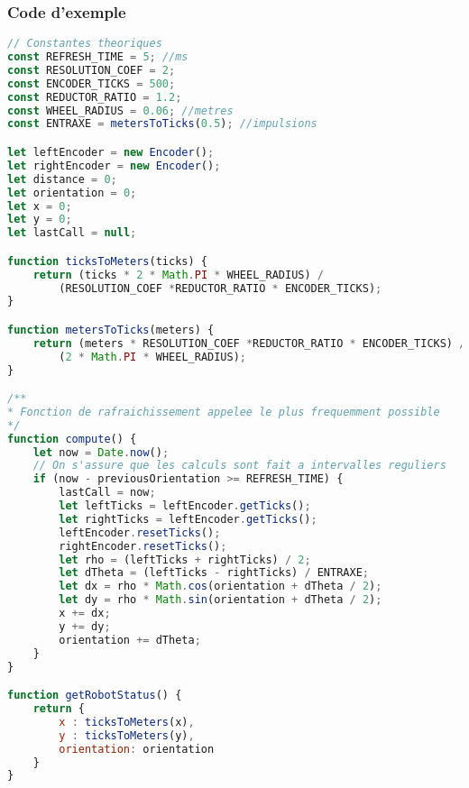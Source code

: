         \subsubsection{Code d'exemple}
            \begin{lstlisting}[language=JavaScript]
// Constantes theoriques
const REFRESH_TIME = 5; //ms
const RESOLUTION_COEF = 2;
const ENCODER_TICKS = 500;
const REDUCTOR_RATIO = 1.2;
const WHEEL_RADIUS = 0.06; //metres
const ENTRAXE = metersToTicks(0.5); //impulsions

let leftEncoder = new Encoder();
let rightEncoder = new Encoder();
let distance = 0;
let orientation = 0;
let x = 0;
let y = 0;
let lastCall = null;

function ticksToMeters(ticks) {
    return (ticks * 2 * Math.PI * WHEEL_RADIUS) /
        (RESOLUTION_COEF *REDUCTOR_RATIO * ENCODER_TICKS);
}

function metersToTicks(meters) {
    return (meters * RESOLUTION_COEF *REDUCTOR_RATIO * ENCODER_TICKS) /
        (2 * Math.PI * WHEEL_RADIUS);
}

/**
* Fonction de rafraichissement appelee le plus frequemment possible
*/
function compute() {
    let now = Date.now();
    // On s'assure que les calculs sont fait a intervalles reguliers
    if (now - previousOrientation >= REFRESH_TIME) {
        lastCall = now;
        let leftTicks = leftEncoder.getTicks();
        let rightTicks = leftEncoder.getTicks();
        leftEncoder.resetTicks();
        rightEncoder.resetTicks();
        let rho = (leftTicks + rightTicks) / 2;
        let dTheta = (leftTicks - rightTicks) / ENTRAXE;
        let dx = rho * Math.cos(orientation + dTheta / 2);
        let dy = rho * Math.sin(orientation + dTheta / 2);
        x += dx;
        y += dy;
        orientation += dTheta;
    }
}

function getRobotStatus() {
    return {
        x : ticksToMeters(x),
        y : ticksToMeters(y),
        orientation: orientation
    }
}
        \end{lstlisting}